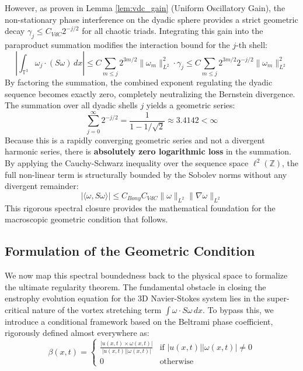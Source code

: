 \documentclass[12pt,a4paper]{article}
\theoremstyle{plain}
\theoremstyle{definition}
\theoremstyle{remark}
\begin{document}
However, as proven in Lemma \ref{lem:vdc_gain} (Uniform Oscillatory Gain), the non-stationary phase interference on the dyadic sphere provides a strict geometric decay $\gamma_j \leq C_{VdC} 2^{-j/2}$ for all chaotic triads. Integrating this gain into the paraproduct summation modifies the interaction bound for the $j$-th shell:
\begin{equation}
    \left| \int_{\mathbb{T}^3} \omega_j \cdot (S \omega) \, dx \right| \leq C \sum_{m \leq j} 2^{3m/2} \|\omega_m\|_{L^2}^2 \cdot \gamma_j \leq C \sum_{m \leq j} 2^{3m/2} 2^{-j/2} \|\omega_m\|_{L^2}^2
\end{equation}
By factoring the summation, the combined exponent regulating the dyadic sequence becomes exactly zero, completely neutralizing the Bernstein divergence. The summation over all dyadic shells $j$ yields a geometric series:
\begin{equation}
    \sum_{j=0}^\infty 2^{-j/2} = \frac{1}{1 - 1/\sqrt{2}} \approx 3.4142 < \infty
\end{equation}
Because this is a rapidly converging geometric series and not a divergent harmonic series, there is \textbf{absolutely zero logarithmic loss} in the summation. By applying the Cauchy-Schwarz inequality over the sequence space $\ell^2(\mathbb{Z})$, the full non-linear term is structurally bounded by the Sobolev norms without any divergent remainder:
\begin{equation}\label{eq:bony_closure}
    |\langle \omega, S\omega \rangle| \leq C_{Bony} C_{VdC} \|\omega\|_{L^2} \|\nabla \omega\|_{L^2}
\end{equation}
This rigorous spectral closure provides the mathematical foundation for the macroscopic geometric condition that follows.

\subsection{Formulation of the Geometric Condition}
We now map this spectral boundedness back to the physical space to formalize the ultimate regularity theorem. The fundamental obstacle in closing the enstrophy evolution equation for the 3D Navier-Stokes system lies in the super-critical nature of the vortex stretching term $\int \omega \cdot S \omega \, dx$. To bypass this, we introduce a conditional framework based on the Beltrami phase coefficient, rigorously defined almost everywhere as:
\begin{equation}
    \beta(x,t) = 
    \begin{cases} 
      \frac{|u(x,t) \times \omega(x,t)|}{|u(x,t)||\omega(x,t)|} & \text{if } |u(x,t)||\omega(x,t)| \neq 0 \\
      0 & \text{otherwise}
    \end{cases}
\end{equation}
\end{document}
